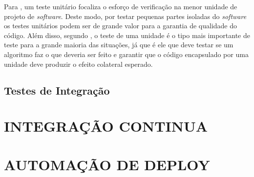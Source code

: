 Para , um teste unitário focaliza o esforço de verificação na menor unidade de projeto de \textit{software}. Deste modo, por testar pequenas partes isoladas do \textit{software} os testes unitários podem ser de grande valor para a garantia de qualidade do código. Além disso, segundo , o teste de uma unidade é o tipo mais importante de teste para a grande maioria das situações, já que é ele que deve testar se um algoritmo faz o que deveria ser feito e garantir que o código encapsulado por uma unidade deve produzir o efeito colateral esperado.

\subsection{Testes de Integração}

\section{INTEGRAÇÃO CONTINUA}

\section{AUTOMAÇÃO DE DEPLOY}